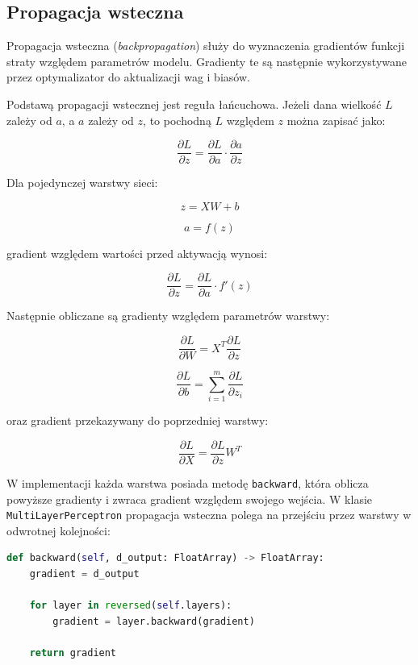\subsection{Propagacja wsteczna}

Propagacja wsteczna (\textit{backpropagation}) służy do wyznaczenia
gradientów funkcji straty względem parametrów modelu. Gradienty te są
następnie wykorzystywane przez optymalizator do aktualizacji wag i biasów.

Podstawą propagacji wstecznej jest reguła łańcuchowa. Jeżeli dana wielkość
\(L\) zależy od \(a\), a \(a\) zależy od \(z\), to pochodną \(L\) względem
\(z\) można zapisać jako:

\[
    \frac{\partial L}{\partial z}
    =
    \frac{\partial L}{\partial a}
    \cdot
    \frac{\partial a}{\partial z}
\]

Dla pojedynczej warstwy sieci:

\[
    z = XW + b
\]

\[
    a = f(z)
\]

gradient względem wartości przed aktywacją wynosi:

\[
    \frac{\partial L}{\partial z}
    =
    \frac{\partial L}{\partial a}
    \cdot
    f'(z)
\]


Następnie obliczane są gradienty względem parametrów warstwy:

\[
    \frac{\partial L}{\partial W}
    =
    X^T
    \frac{\partial L}{\partial z}
\]

\[
    \frac{\partial L}{\partial b}
    =
    \sum_{i=1}^{m}
    \frac{\partial L}{\partial z_i}
\]

oraz gradient przekazywany do poprzedniej warstwy:

\[
    \frac{\partial L}{\partial X}
    =
    \frac{\partial L}{\partial z}
    W^T
\]

W implementacji każda warstwa posiada metodę \texttt{backward}, która
oblicza powyższe gradienty i zwraca gradient względem swojego wejścia.
W klasie \texttt{MultiLayerPerceptron} propagacja wsteczna polega na
przejściu przez warstwy w odwrotnej kolejności:

\begin{lstlisting}[language=Python, caption={Fragment kodu pokazujący definicje propagacji wstecz dla całej sieci.}, label={lst:backward}, basicstyle=\ttfamily\small, breaklines=true, frame=single]
def backward(self, d_output: FloatArray) -> FloatArray:
    gradient = d_output

    for layer in reversed(self.layers):
        gradient = layer.backward(gradient)

    return gradient
\end{lstlisting}

